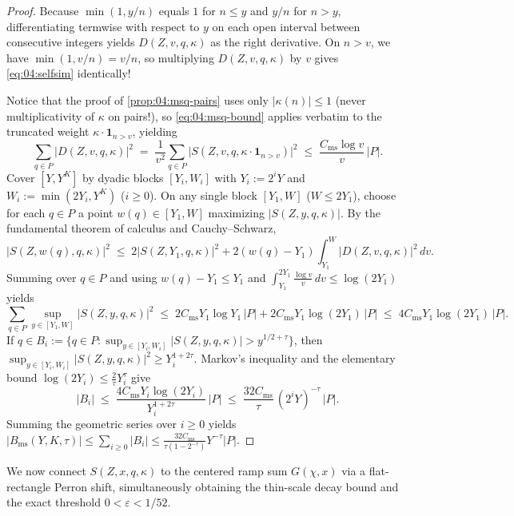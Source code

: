 \begin{proof}
Because $\min(1, y/n)$ equals $1$ for $n \le y$ and $y/n$ for $n > y$, differentiating termwise with respect to $y$ on each open interval between consecutive integers yields $D(Z, v, q, \kappa)$ as the right derivative. On $n > v$, we have $\min(1, v/n) = v/n$, so multiplying $D(Z, v, q, \kappa)$ by $v$ gives \eqref{eq:04:selfsim} identically!

Notice that the proof of \cref{prop:04:msq-pairs} uses only $|\kappa(n)| \le 1$ (never multiplicativity of $\kappa$ on pairs!), so \eqref{eq:04:msq-bound} applies verbatim to the truncated weight $\kappa \cdot \mathbf{1}_{n > v}$, yielding
\[
  \sum_{q \in P} \bigl|D(Z, v, q, \kappa)\bigr|^2 \;=\; \frac{1}{v^2}\sum_{q \in P} \bigl|S(Z, v, q, \kappa \cdot \mathbf{1}_{n>v})\bigr|^2
  \;\le\; \frac{C_{\mathrm{ms}} \log v}{v}\, |P|.
\]
Cover $[Y, Y^K]$ by dyadic blocks $[Y_i, W_i]$ with $Y_i := 2^i Y$ and $W_i := \min(2Y_i, Y^K)$ ($i \ge 0$). On any single block $[Y_1, W]$ ($W \le 2Y_1$), choose for each $q \in P$ a point $w(q) \in [Y_1, W]$ maximizing $|S(Z, y, q, \kappa)|$. By the fundamental theorem of calculus and Cauchy--Schwarz,
\[
  |S(Z, w(q), q, \kappa)|^2 \;\le\; 2|S(Z, Y_1, q, \kappa)|^2 + 2(w(q) - Y_1)\int_{Y_1}^{W} |D(Z, v, q, \kappa)|^2\,dv.
\]
Summing over $q \in P$ and using $w(q) - Y_1 \le Y_1$ and $\int_{Y_1}^{2Y_1} \frac{\log v}{v}\,dv \le \log(2Y_1)$ yields
\[
  \sum_{q \in P} \sup_{y \in [Y_1, W]} |S(Z, y, q, \kappa)|^2
  \;\le\; 2 C_{\mathrm{ms}} Y_1 \log Y_1\,|P| + 2 C_{\mathrm{ms}} Y_1 \log(2Y_1)\,|P|
  \;\le\; 4 C_{\mathrm{ms}} Y_1 \log(2Y_1)\,|P|.
\]
If $q \in B_i := \{q \in P : \sup_{y \in [Y_i, W_i]} |S(Z, y, q, \kappa)| > y^{1/2+\tau}\}$, then $\sup_{y \in [Y_i, W_i]} |S(Z, y, q, \kappa)|^2 \ge Y_i^{1 + 2\tau}$. Markov's inequality and the elementary bound $\log(2Y_i) \le \frac{2}{\tau} Y_i^{\tau}$ give
\[
  |B_i| \;\le\; \frac{4 C_{\mathrm{ms}} Y_i \log(2Y_i)}{Y_i^{1 + 2\tau}}\,|P|
  \;\le\; \frac{32 C_{\mathrm{ms}}}{\tau}\,(2^i Y)^{-\tau}\,|P|.
\]
Summing the geometric series over $i \ge 0$ yields $|B_{\mathrm{ms}}(Y, K, \tau)| \le \sum_{i \ge 0} |B_i| \le \frac{32 C_{\mathrm{ms}}}{\tau(1 - 2^{-\tau})} Y^{-\tau} |P|$.
\end{proof}

We now connect $S(Z, x, q, \kappa)$ to the centered ramp sum $G(\chi, x)$ via a flat-rectangle Perron shift, simultaneously obtaining the thin-scale decay bound and the exact threshold $0 < \varepsilon < 1/52$.

